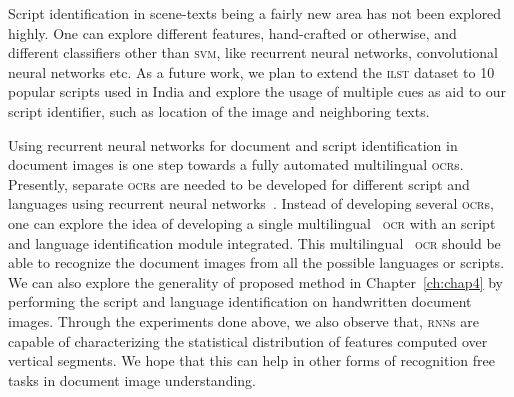 Script identification in scene-texts being a fairly new area has not been explored highly. One can explore different features, hand-crafted or otherwise, and different classifiers other than \textsc{svm}, like recurrent neural networks, convolutional neural networks etc. As a future work, we plan to extend the \textsc{ilst} dataset to 10 popular scripts used in India and explore the usage of multiple cues as aid to our script identifier, such as location of the image and neighboring texts.

Using recurrent neural networks for document and script identification in document images is one step towards a fully automated multilingual \textsc{ocr}s. Presently, separate \textsc{ocr}s are needed to be developed for different script and languages using recurrent neural networks~\cite{PraveenDAS}. Instead of developing several \textsc{ocr}s, one can explore the idea of developing a single multilingual ~\textsc{ocr} with an script and language identification module integrated. This multilingual ~\textsc{ocr} should be able to recognize the document images from all the possible languages or scripts. We can also explore the generality of proposed method in Chapter~\ref{ch:chap4} by performing the script and language identification on handwritten document images. Through the experiments done above, we also observe that, \textsc{rnn}s are capable of characterizing the statistical distribution of features computed over vertical segments. We hope that this can help in other forms of recognition free tasks in document image understanding.




